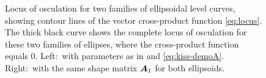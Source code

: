 \begin{figure}[htb]
\begin{minipage}[b]{.49\linewidth}
 \end{minipage}
  \caption{Locus of osculation for two families of ellipsoidal level curves, showing contour lines of the vector cross-product function \eqref{eq:locus}.
  The thick black curve shows the complete locus of osculation for these two families of ellipses, where the cross-product function equals 0.
Left:~with parameters as in  and \eqref{eq:kiss-demoA}. Right:~with the same shape matrix $\bm{A}_1$ for both
ellipsoids.}
  \label{fig:kiss-demo2}
\end{figure}
%
